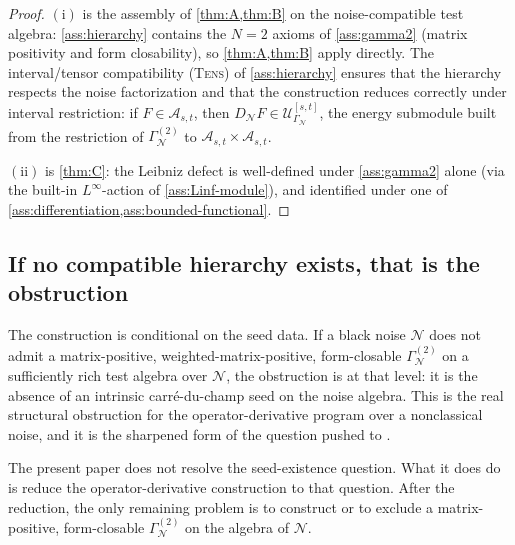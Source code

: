 \documentclass[11pt,reqno]{amsart}
\theoremstyle{plain}
\theoremstyle{definition}
\theoremstyle{remark}
\newcommand{\cA}{\mathcal A}
\newcommand{\cN}{\mathcal N}
\newcommand{\cU}{\mathcal U}
\newcommand{\dN}{D_{\cN}}
\begin{document}
\begin{proof}
$(\mathrm i)$ is the assembly of \cref{thm:A,thm:B} on the
noise-compatible test algebra: \cref{ass:hierarchy} contains
the $N=2$ axioms of \cref{ass:gamma2} (matrix positivity and
form closability), so \cref{thm:A,thm:B} apply directly. The
interval/tensor compatibility \textsc{(Tens)} of
\cref{ass:hierarchy} ensures that the hierarchy respects the
noise factorization and that the construction reduces correctly
under interval restriction: if $F\in\cA_{s,t}$, then
$\dN F\in\cU_{\Gamma_{\cN}}^{[s,t]}$, the energy submodule built
from the restriction of $\Gamma^{(2)}_{\cN}$ to
$\cA_{s,t}\times\cA_{s,t}$.

$(\mathrm{ii})$ is \cref{thm:C}: the Leibniz defect is
well-defined under \cref{ass:gamma2} alone (via the built-in
$L^{\infty}$-action of \cref{ass:Linf-module}), and identified
under one of
\cref{ass:differentiation,ass:bounded-functional}.
\end{proof}

\subsection{If no compatible hierarchy exists, that is the obstruction}\label{sec:nonclassical-obstruction}

The construction is conditional on the seed data. If a black
noise $\cN$ does not admit a matrix-positive, weighted-matrix-positive, form-closable
$\Gamma^{(2)}_{\cN}$ on a sufficiently rich test algebra over
$\cN$, the obstruction is at that level: it is the absence of
an intrinsic carr\'e-du-champ seed on the noise algebra. This
is the real structural obstruction for the operator-derivative
program over a nonclassical noise, and it is the sharpened
form of the question pushed to
\cite[Prog.~7.1]{PrimitiveDivergence}.

The present paper does not resolve the seed-existence question.
What it does do is reduce the operator-derivative construction
to that question. After the reduction, the only remaining
problem is to construct or to exclude a matrix-positive,
form-closable $\Gamma^{(2)}_{\cN}$ on the algebra of $\cN$.
\end{document}
